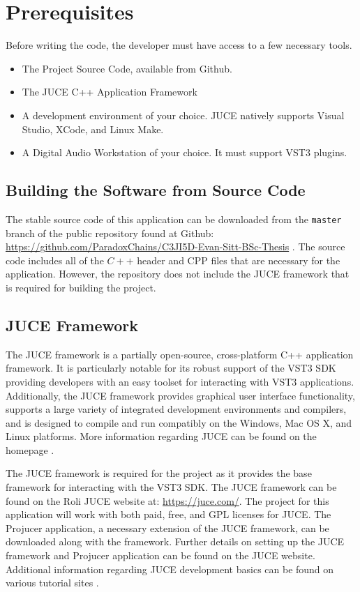 \documentclass[a4paper,12pt]{report}
\begin{document}
\section{Prerequisites}
\label{sec:prereq}
Before writing the code, the developer must have access to a few necessary tools.
\begin{itemize}
\item The Project Source Code, available from Github\cite{github}.
\item The JUCE C++ Application Framework\cite{madewithjuce}
\item A development environment of your choice. JUCE natively supports Visual Studio, XCode, and Linux Make.
\item A Digital Audio Workstation of your choice. It must support VST3 plugins.
\end{itemize}
\subsection{Building the Software from Source Code}
\label{subsec:buildingasoftware}
The stable source code of this application can be downloaded from the \texttt{master} branch of the public repository found at Github: \href{https://github.com/ParadoxChains/C3JI5D-Evan-Sitt-BSc-Thesis}{https://github.com/\-ParadoxChains/\-C3JI5D-Evan-Sitt-BSc-Thesis} \cite{github}. The source code includes all of the $C++$ header and CPP files that are necessary for the application. However, the repository does not include the JUCE framework that is required for building the project.

\subsection{JUCE Framework}
\label{subsec:juceframework}
The JUCE framework is a partially open-source, cross-platform C++ application framework. It is particularly notable for its robust support of the VST3 SDK providing developers with an easy toolset for interacting with VST3 applications. Additionally, the JUCE framework provides graphical user interface functionality, supports a large variety of integrated development environments and compilers, and is designed to compile and run compatibly on the Windows, Mac OS X, and Linux platforms. More information regarding JUCE can be found on the homepage \cite{madewithjuce}.

The JUCE framework is required for the project as it provides the base framework for interacting with the VST3 SDK. The JUCE framework can be found on the Roli JUCE website at: \href{https://juce.com/}{https://juce.com/}. The project for this application will work with both paid, free, and GPL licenses for JUCE. The Projucer application, a necessary extension of the JUCE framework, can be downloaded along with the framework. Further details on setting up the JUCE framework and Projucer application can be found on the JUCE website\cite{madewithjuce}. Additional information regarding JUCE development basics can be found on various tutorial sites \cite{jucevstdevelopment}.
\end{document}
